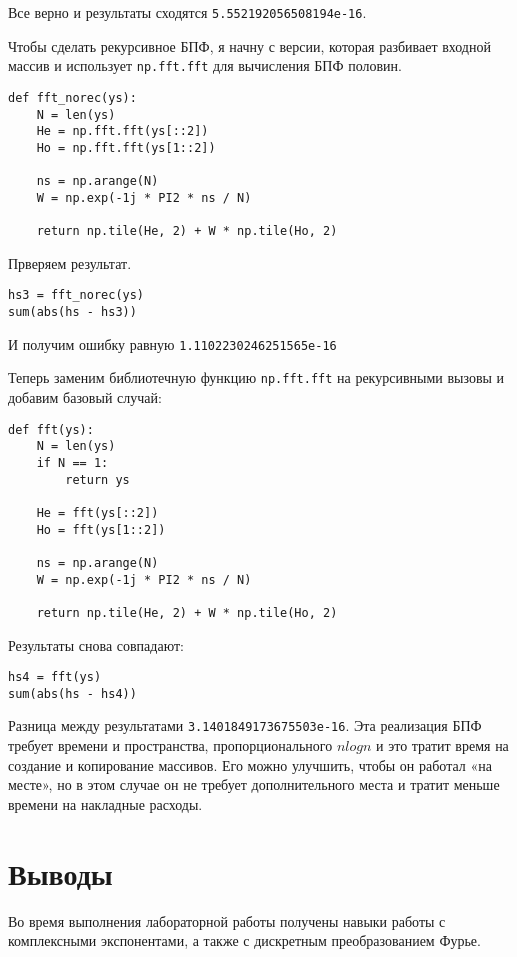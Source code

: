 \documentclass[a4paper,12pt]{report}
\begin{document}
Все верно и результаты сходятся \texttt{5.552192056508194e-16}.  

Чтобы сделать рекурсивное БПФ, я начну с версии, которая разбивает входной массив и использует \texttt{np.fft.fft} для вычисления БПФ половин.

\begin{lstlisting}[caption=Функция \texttt{fft\_norec}]
def fft_norec(ys):
    N = len(ys)
    He = np.fft.fft(ys[::2])
    Ho = np.fft.fft(ys[1::2])
    
    ns = np.arange(N)
    W = np.exp(-1j * PI2 * ns / N)
    
    return np.tile(He, 2) + W * np.tile(Ho, 2)
\end{lstlisting}

Прверяем результат.

\begin{lstlisting}[caption=Сравнение реализаций]
hs3 = fft_norec(ys)
sum(abs(hs - hs3))
\end{lstlisting}

И получим ошибку равную \texttt{1.1102230246251565e-16}

Теперь заменим библиотечную функцию \texttt{np.fft.fft} на рекурсивными вызовы и добавим базовый случай:

\begin{lstlisting}[caption=Функция \texttt{fft}]
def fft(ys):
    N = len(ys)
    if N == 1:
        return ys
    
    He = fft(ys[::2])
    Ho = fft(ys[1::2])
    
    ns = np.arange(N)
    W = np.exp(-1j * PI2 * ns / N)
    
    return np.tile(He, 2) + W * np.tile(Ho, 2)
\end{lstlisting}

Результаты снова совпадают:

\begin{lstlisting}[caption=Сравнение реализаций]
hs4 = fft(ys)
sum(abs(hs - hs4))
\end{lstlisting}

Разница между результатами \texttt{3.1401849173675503e-16}.
Эта реализация БПФ требует времени и пространства, пропорционального $nlogn$ и это тратит время на создание и копирование массивов. Его можно улучшить, чтобы он работал «на месте», но в этом случае он не требует дополнительного места и тратит меньше времени на накладные расходы.

\chapter{Выводы}

Во время выполнения лабораторной работы получены навыки работы с комплексными экспонентами, а также с дискретным преобразованием Фурье.
\end{document}

